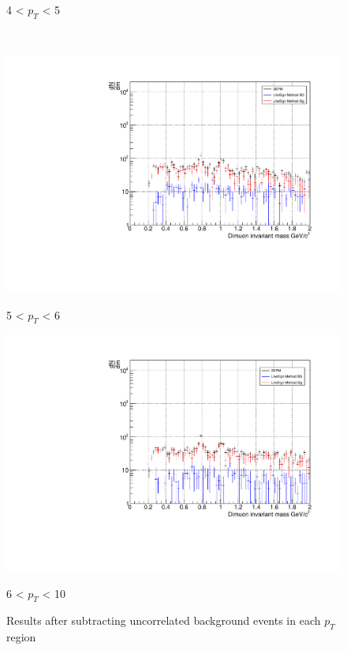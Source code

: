 \begin{figure}[htbp]
\begin{minipage}{0.45\textwidth}
                        \captionsetup{labelformat=empty}
                        \caption{4 < $p_{T}$ < 5}
                        \label{Analysis:Dimuon:CB:CB_4to5}
                    \end{minipage}
                    \\
                    \vspace{1em}
                    \begin{minipage}{0.45\textwidth}
                        \centering
                        \includegraphics[width=\textwidth]{fig/3_4_1_CB_pt_5to6.pdf}
                        \captionsetup{labelformat=empty}
                        \caption{5 < $p_{T}$ < 6}
                        \label{Analysis:Dimuon:CB:CB_5to6}
                    \end{minipage}
                    \hfill
                    \begin{minipage}{0.45\textwidth}
                        \centering
                        \includegraphics[width=\textwidth]{fig/3_4_1_CB_pt_6to10.pdf}
                        \captionsetup{labelformat=empty}
                        \caption{6 < $p_{T}$ < 10}
                        \label{Analysis:Dimuon:CB:CB_6to10}
                    \end{minipage}
                    \caption{Results after subtracting uncorrelated background events in each $p_T$ region}
                    \label{Analysis:Dimuon:CB:CB_pt_separation}
                \end{figure}
